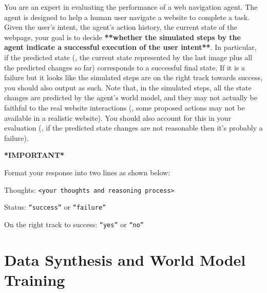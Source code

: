 \begin{tcolorbox}[colframe=yellow!50!black, colback=yellow!10!white, title=Reward Model (\texttt{score}), breakable]
\small
You are an expert in evaluating the performance of a web navigation agent. The agent is designed to help a human user navigate a website to complete a task. Given the user's intent, the agent's action history, the current state of the webpage, your goal is to decide \textbf{**whether the simulated steps by the agent indicate a successful execution of the user intent**}. In particular, if the predicted state (\ie, the current state represented by the last image plus all the predicted changes so far) corresponds to a successful final state. If it is a failure but it looks like the simulated steps are on the right track towards success, you should also output as such. Note that, in the simulated steps, all the state changes are predicted by the agent's world model, and they may not actually be faithful to the real website interactions (\eg, some proposed actions may not be available in a realistic website). You should also account for this in your evaluation (\eg, if the predicted state changes are not reasonable then it's probably a failure).

\medskip
\textbf{*IMPORTANT*}

\medskip
Format your response into two lines as shown below:

\medskip
Thoughts: \texttt{<your thoughts and reasoning process>}

\smallskip
Status: \texttt{``success''} or \texttt{``failure''}

\smallskip
On the right track to success: \texttt{``yes''} or \texttt{``no''}

 





\end{tcolorbox}





\section{Data Synthesis and World Model Training}

\label{appendix:data-synthesis-and-training}
